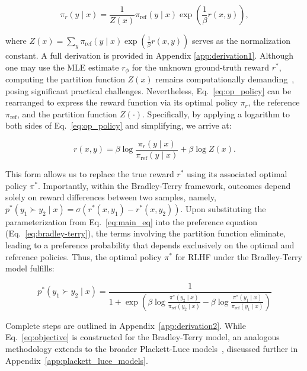 \begin{equation}\label{eq:op_policy}
    \pi_r(y\mid x) = \frac{1}{Z(x)}\pi_\text{ref}(y\mid x)\exp\left(\frac{1}{\beta}r(x, y)\right),
\end{equation}

where $Z(x) =\sum_{y}\pi_\text{ref}(y\mid x)\exp\left(\frac{1}{\beta}r(x, y)\right)$ serves as the normalization constant. A full derivation is provided in Appendix \ref{app:derivation1}. Although one may use the MLE estimate $r_{\phi}$ for the unknown ground-truth reward $r^*$, computing the partition function $Z(x)$ remains computationally demanding~\citep{korbak2022reinforcement, go2023aligning}, posing significant practical challenges. Nevertheless, Eq.~\ref{eq:op_policy} can be rearranged to express the reward function via its optimal policy $\pi_r$, the reference $\pi_\text{ref}$, and the partition function $Z(\cdot)$. Specifically, by applying a logarithm to both sides of Eq.~\ref{eq:op_policy} and simplifying, we arrive at:

\begin{equation}\label{eq:main_eq}
    r(x,y) =\beta \log \frac{\pi_r(y\mid x)}{\pi_\text{ref}(y\mid x)} + \beta \log Z(x).
\end{equation}

This form allows us to replace the true reward $r^*$ using its associated optimal policy $\pi^*$. Importantly, within the Bradley-Terry framework, outcomes depend solely on reward differences between two samples, namely, ${p^*(y_1 \succ y_2 \mid x) = \sigma(r^*(x, y_1) - r^*(x, y_2))}$. Upon substituting the parameterization from Eq.~\ref{eq:main_eq} into the preference equation (Eq.~\ref{eq:bradley-terry}), the terms involving the partition function eliminate, leading to a preference probability that depends exclusively on the optimal and reference policies. Thus, the optimal policy $\pi^*$ for RLHF under the Bradley-Terry model fulfills:

\begin{equation}\label{eq:objective}
    p^*(y_1\succ y_2 \mid x)=\frac{1}{1 + \exp\left(\beta \log \frac{\pi^*(y_2\mid x)}{\pi_\text{ref}(y_2\mid x)} - \beta \log \frac{\pi^*(y_1\mid x)}{\pi_\text{ref}(y_1\mid x)}\right)}
\end{equation}

Complete steps are outlined in Appendix~\ref{app:derivation2}. While Eq.~\ref{eq:objective} is constructed for the Bradley-Terry model, an analogous methodology extends to the broader Plackett-Luce models~\citep{plackett1975analysis, luce2012individual}, discussed further in Appendix~\ref{app:plackett_luce_models}.

